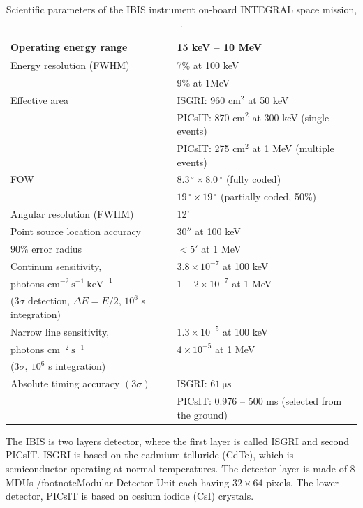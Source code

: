 \documentclass[oneside,a4paper,11pt]{report}
\begin{document}
\begin{table}[hbt!]\footnotesize
\begin{center}
\caption{Scientific parameters of the IBIS instrument on-board INTEGRAL space mission, \citet{osam}.}
\begin{tabular}{|l|l|}
\hline
Operating energy range     & 15 keV -- 10 MeV\\
\hline
Energy resolution (FWHM)   & 7\% at 100 keV\\
                           & 9\% at 1MeV  \\
\hline
Effective area             & ISGRI: 960 $\mathrm{cm^2}$ at 50 keV \\
                           & PICsIT: 870 $\mathrm{cm^2}$ at 300 keV (single events)\\
                           & PICsIT: 275 $\mathrm{cm^2}$ at 1 MeV (multiple events)\\
\hline
FOW                        &$8.3\,^{\circ} \times 8.0\,^{\circ}$ (fully coded) \\
                           &$19\,^{\circ} \times 19\,^{\circ}$ (partially coded, 50\%)\\
\hline
Angular resolution (FWHM)  & 12' \\
\hline
Point source location accuracy & $30''$ at 100 keV \\
$90\%$ error radius      & $<5'$ at 1 MeV \\
\hline
Continum sensitivity, & $3.8 \times 10^{-7}$ at 100 keV \\
photons $\mathrm{cm^{-2}\: s^{-1}\: keV^{-1}}$ & $1 - 2 \times 10^{-7}$ at 1 MeV \\
($3 \sigma$ detection, $\Delta E = E/2$, $10^6$ s integration) &  \\
\hline
Narrow line sensitivity, & $1.3 \times 10^{-5}$ at 100 keV \\
photons $\mathrm{cm^{-2}\: s^{-1}}$ & $4 \times 10^{-5}$ at 1 MeV \\
($3\sigma,\:10^6$ s integration)&  \\
\hline
Absolute timing accuracy $(3 \sigma)$& ISGRI: $61 \:\mathrm{\mu s}$\\
 & PICsIT: 0.976 -- 500 ms (selected from the ground)\\
\hline
\end{tabular}
\end{center}
\end{table}

The IBIS is two layers detector, where the first layer is called ISGRI and second PICsIT. ISGRI is based 
on the cadmium telluride (CdTe), which is semiconductor operating at normal temperatures. The detector 
layer is made of 8 MDUs /footnote{Modular Detector Unit} each having $32\times64$ pixels. The lower 
detector, PICsIT is based on cesium iodide (CsI) crystals. 
\end{document}

